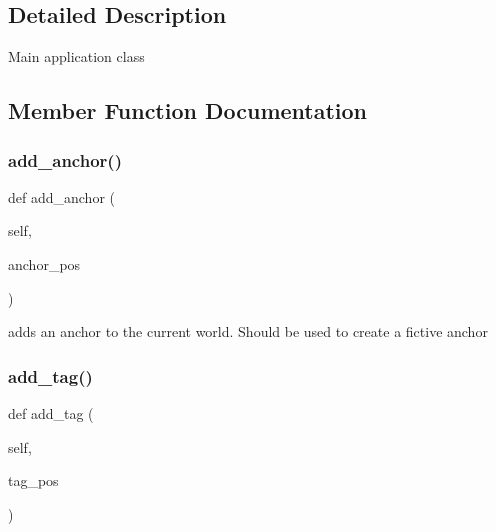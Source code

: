 \subsection{Detailed Description}
\begin{DoxyVerb}Main application class\end{DoxyVerb}
 

\subsection{Member Function Documentation}
\mbox{\label{classapplication_1_1_application_a919e7c637c4e2c70b80ea71ff708e0c5}} 
\subsubsection{\texorpdfstring{add\+\_\+anchor()}{add\_anchor()}}
{\footnotesize\ttfamily def add\+\_\+anchor (\begin{DoxyParamCaption}\item[{}]{self,  }\item[{}]{anchor\+\_\+pos }\end{DoxyParamCaption})}

\begin{DoxyVerb}adds an anchor to the current world. Should be used to create a fictive anchor\end{DoxyVerb}
 \mbox{\label{classapplication_1_1_application_afb149cfcea0378638df7b16662fb4516}} 
\subsubsection{\texorpdfstring{add\+\_\+tag()}{add\_tag()}}
{\footnotesize\ttfamily def add\+\_\+tag (\begin{DoxyParamCaption}\item[{}]{self,  }\item[{}]{tag\+\_\+pos }\end{DoxyParamCaption})}

